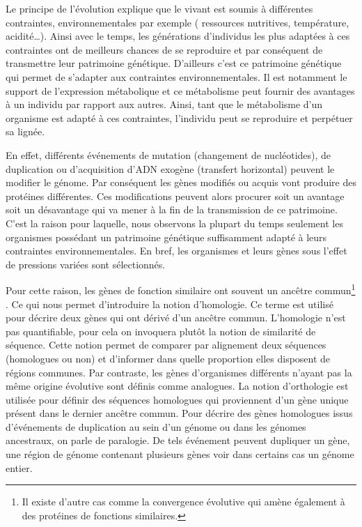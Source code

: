 \begin{refsegment}
    Le principe de l'évolution explique que le vivant est soumis à différentes contraintes, environnementales par exemple ( ressources nutritives, température, acidité\ldots ). Ainsi avec le temps, les générations d’individus les plus adaptées à ces contraintes ont de meilleurs chances de se reproduire et par conséquent de transmettre leur patrimoine génétique. D’ailleurs c’est ce patrimoine génétique qui permet de s’adapter aux contraintes environnementales. Il est notamment le support de l’expression métabolique et ce métabolisme peut fournir des avantages à un individu par rapport aux autres. Ainsi, tant que le métabolisme d’un organisme est adapté à ces contraintes, l’individu peut se reproduire et perpétuer sa lignée.
    
    En effet, différents événements de mutation (changement de nucléotides), de duplication ou d’acquisition d’ADN exogène (transfert horizontal) peuvent le modifier le génome. Par conséquent les gènes modifiés ou acquis vont produire des protéines différentes. Ces modifications peuvent alors procurer soit un avantage soit un désavantage qui va mener à la fin de la transmission de ce patrimoine. C'est la raison pour laquelle, nous observons la plupart du temps seulement les organismes possédant un patrimoine génétique suffisamment adapté à leurs contraintes environnementales. En bref, les organismes et leurs gènes sous l’effet de pressions variées sont sélectionnés.
    
    Pour cette raison, les gènes de fonction similaire ont souvent un ancêtre commun\footnote{Il existe d'autre cas comme la convergence évolutive qui amène également à des protéines de fonctions similaires. } . Ce qui nous permet d'introduire la notion d'homologie. Ce terme est utilisé pour décrire deux gènes qui ont dérivé d'un ancêtre commun. L'homologie n'est pas quantifiable, pour cela on invoquera plutôt la notion de similarité de séquence. Cette notion permet de comparer par alignement deux séquences (homologues ou non) et d'informer dans quelle proportion elles disposent de régions communes. Par contraste, les gènes d’organismes différents n’ayant pas la même origine évolutive sont définis comme analogues. La notion d'orthologie est utilisée pour définir des séquences homologues qui proviennent d’un gène unique présent dans le dernier ancêtre commun. Pour décrire des gènes homologues issus d'événements de duplication au sein d'un génome ou dans les génomes ancestraux, on parle de paralogie. De tels événement peuvent dupliquer un gène, une région de génome contenant plusieurs gènes voir dans certains cas un génome entier.
    

\end{refsegment}
